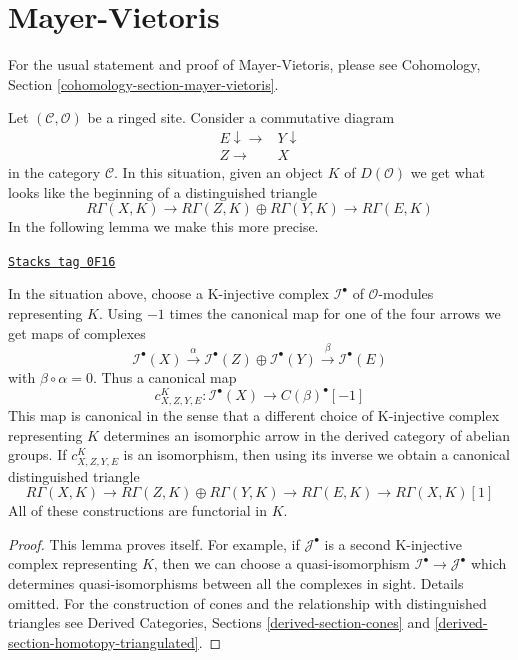\section{Mayer-Vietoris}
\label{sites-cohomology-section-mayer-vietoris}
For the usual statement and proof of Mayer-Vietoris, please
see Cohomology, Section \ref{cohomology-section-mayer-vietoris}.

\medskip\noindent
Let $(\mathcal{C}, \mathcal{O})$ be a ringed site. Consider a
commutative diagram
$$
\begin{array}{cc}E \downarrow\longrightarrow & Y \downarrow \\ Z \longrightarrow & X\end{array}
$$
in the category $\mathcal{C}$. In this situation, given an object
$K$ of $D(\mathcal{O})$ we get what looks like the
beginning of a distinguished triangle
$$
R\Gamma(X, K) \to
R\Gamma(Z, K) \oplus
R\Gamma(Y, K) \to
R\Gamma(E, K)
$$
In the following lemma we make this more precise.

\begin{lemma}[C square]
\label{sites-cohomology-lemma-c-square}
\href{https://stacks.math.columbia.edu/tag/0F16}{\texttt{Stacks tag 0F16}}

In the situation above, choose a K-injective complex $\mathcal{I}^\bullet$
of $\mathcal{O}$-modules representing $K$. Using $-1$ times the canonical map
for one of the four arrows we get maps of complexes
$$
\mathcal{I}^\bullet(X) \xrightarrow{\alpha}
\mathcal{I}^\bullet(Z) \oplus
\mathcal{I}^\bullet(Y) \xrightarrow{\beta}
\mathcal{I}^\bullet(E)
$$
with $\beta \circ \alpha = 0$. Thus a canonical map
$$
c^K_{X, Z, Y, E} :
\mathcal{I}^\bullet(X)
\longrightarrow
C(\beta)^\bullet[-1]
$$
This map is canonical in the sense that a different choice
of K-injective complex representing $K$ determines an isomorphic
arrow in the derived category of abelian groups. If $c^K_{X, Z, Y, E}$
is an isomorphism, then using its inverse we obtain a canonical
distinguished triangle
$$
R\Gamma(X, K) \to
R\Gamma(Z, K) \oplus
R\Gamma(Y, K) \to
R\Gamma(E, K) \to
R\Gamma(X, K)[1]
$$
All of these constructions are functorial in $K$.
\end{lemma}

\begin{proof}
This lemma proves itself. For example, if $\mathcal{J}^\bullet$
is a second K-injective complex representing $K$, then
we can choose a quasi-isomorphism
$\mathcal{I}^\bullet \to \mathcal{J}^\bullet$
which determines quasi-isomorphisms between all the complexes
in sight. Details omitted. For the construction of cones
and the relationship with distinguished triangles see
Derived Categories, Sections \ref{derived-section-cones} and
\ref{derived-section-homotopy-triangulated}.
\end{proof}

